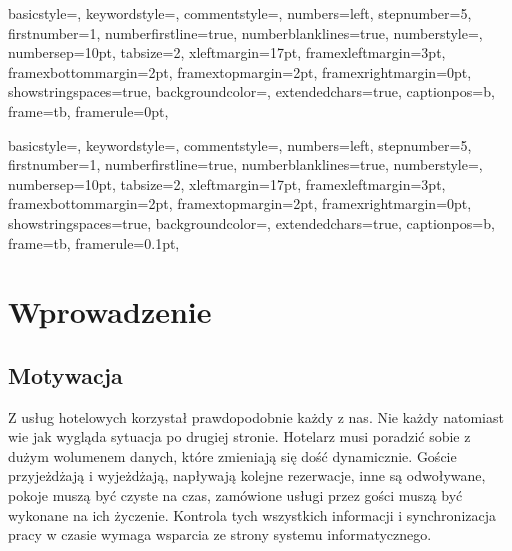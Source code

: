 \documentclass[a4paper,onecolumn,oneside,11pt,wide,floatssmall]{mwrep}
\theoremstyle{definition}
\theoremstyle{plain}%
\theoremstyle{remark}
\begin{document}
{
basicstyle={\footnotesize},
keywordstyle={\bf\footnotesize\color{blue}},
commentstyle={\em\footnotesize\color{magenta}},
numbers=left,
stepnumber=5,
firstnumber=1,
numberfirstline=true,
numberblanklines=true,
numberstyle={\sf\tiny},
numbersep=10pt,
tabsize=2,
xleftmargin=17pt,
framexleftmargin=3pt,
framexbottommargin=2pt,
framextopmargin=2pt,
framexrightmargin=0pt,
showstringspaces=true,
backgroundcolor={\color{ListingBackground}},
extendedchars=true,
captionpos=b,
frame=tb,
framerule=0pt,
}

{
basicstyle={\footnotesize},
keywordstyle={\bf\footnotesize\color{blue}},
commentstyle={\em\footnotesize\color{magenta}},
numbers=left,
stepnumber=5,
firstnumber=1,
numberfirstline=true,
numberblanklines=true,
numberstyle={\sf\tiny},
numbersep=10pt,
tabsize=2,
xleftmargin=17pt,
framexleftmargin=3pt,
framexbottommargin=2pt,
framextopmargin=2pt,
framexrightmargin=0pt,
showstringspaces=true,
backgroundcolor={\color{ListingBackground}},
extendedchars=true,
captionpos=b,
frame=tb,
framerule=0.1pt,
}

\renewcommand*\lstlistingname{Wydruk}
\renewcommand*\lstlistlistingname{Spis wydruków}

\renewcommand{\baselinestretch}{1.0}
\raggedbottom



\tableofcontents


\newpage
{}
\setcounter{page}{1}


\chapter{Wprowadzenie}
\section{Motywacja}
Z usług hotelowych korzystał prawdopodobnie każdy z nas. Nie każdy natomiast wie jak wygląda sytuacja po drugiej stronie. Hotelarz musi poradzić sobie z dużym wolumenem danych, które zmieniają się dość dynamicznie. Goście przyjeżdżają i wyjeżdżają, napływają kolejne rezerwacje, inne są odwoływane, pokoje muszą być czyste na czas, zamówione usługi przez gości muszą być wykonane na ich życzenie. Kontrola tych wszystkich informacji i synchronizacja pracy w czasie wymaga wsparcia ze strony systemu informatycznego.
\end{document}
